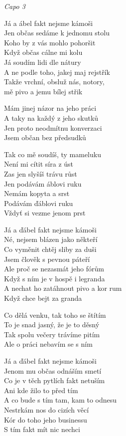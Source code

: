 
\re{}\textit{Capo 3}

\ve{}
Já a ábel fakt nejsme kámoši\\
Jen občas sedáme k jednomu stolu\\
Koho by z vás mohlo pohoršit\\
Když občas cálne mi kolu\\
Já soudím lidi dle nátury\\
A ne podle toho, jakej maj rejstřík\\
Takže vrchní, obsluž nás, notory,\\
mě pivo a jemu bílej střik

Mám jinej názor na jeho práci\\
A taky na každý z jeho skutků\\
Jen proto neodmítnu konverzaci\\
Jsem občan bez předsudků 

\cho{}
Tak co mě soudíš, ty mameluku\\
Není mi cítit síra z úst\\
Zas jen slyšíš trávu růst\\
Jen podávám áblovi ruku \\
Nemám kopyta a srst\\
Podávám ďáblovi ruku\\
Vždyť si vezme jenom prst

\ve{}
Já a ďábel fakt nejsme kámoši\\
Né, nejsem blázen jako někteří\\
Co vyměnit chtěj sliby za duši\\
Jsem člověk s pevnou páteří\\
Ale proč se nezasmát jeho fórům\\
Když s ním je v hospě i legranda\\
A nechat ho zatáhnout pivo a kor rum\\
Když chce bejt za granda

Co dělá venku, tak toho se štítím\\
To je snad jasný, že je to děsný\\
Tak spolu večery trávíme pitím\\
Ale o práci nebavím se s ním

\cho{}

\ve{}
Já a ďábel fakt nejsme kámoši\\
Jenom mu občas odnáším smetí\\
Co je v těch pytlích fakt netuším\\
Ani kde žilo to před tím\\
A co bude s tím tam, kam to odnesu\\
Nestrkám nos do cizích věcí\\
Kór do toho jeho businessu\\
S tím fakt mít nic nechci

